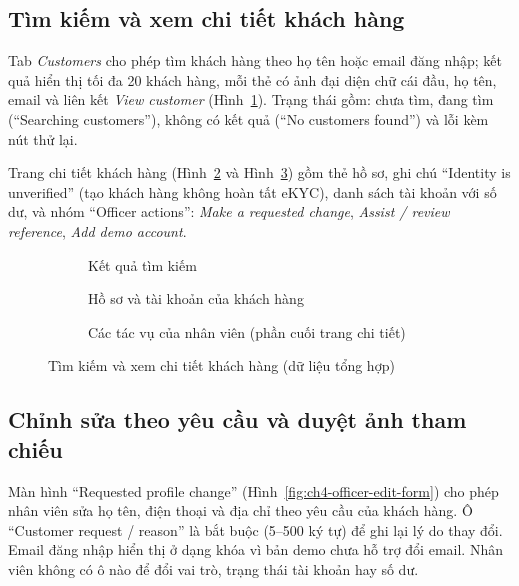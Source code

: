 \subsection{Tìm kiếm và xem chi tiết khách hàng}
\label{sec:ch4-officer-search}

Tab \textit{Customers} cho phép tìm khách hàng theo họ tên hoặc email đăng nhập; kết quả hiển thị tối đa 20 khách hàng, mỗi thẻ có ảnh đại diện chữ cái đầu, họ tên, email và liên kết \textit{View customer} (Hình~\ref{fig:ch4-officer-search-list}). Trạng thái gồm: chưa tìm, đang tìm (``Searching customers''), không có kết quả (``No customers found'') và lỗi kèm nút thử lại.

Trang chi tiết khách hàng (Hình~\ref{fig:ch4-officer-detail-top} và Hình~\ref{fig:ch4-officer-detail-actions}) gồm thẻ hồ sơ, ghi chú ``Identity is unverified'' (tạo khách hàng không hoàn tất eKYC), danh sách tài khoản với số dư, và nhóm ``Officer actions'': \textit{Make a requested change}, \textit{Assist / review reference}, \textit{Add demo account}.

\begin{figure}[H]
\centering
\begin{subfigure}[t]{0.31\textwidth}
  \centering
  \caption{Kết quả tìm kiếm}
  \label{fig:ch4-officer-search-list}
\end{subfigure}\hfill
\begin{subfigure}[t]{0.31\textwidth}
  \centering
  \caption{Hồ sơ và tài khoản của khách hàng}
  \label{fig:ch4-officer-detail-top}
\end{subfigure}\hfill
\begin{subfigure}[t]{0.31\textwidth}
  \centering
  \caption{Các tác vụ của nhân viên (phần cuối trang chi tiết)}
  \label{fig:ch4-officer-detail-actions}
\end{subfigure}
\caption{Tìm kiếm và xem chi tiết khách hàng (dữ liệu tổng hợp)}
\label{fig:ch4-officer-search}
\end{figure}

\subsection{Chỉnh sửa theo yêu cầu và duyệt ảnh tham chiếu}
\label{sec:ch4-officer-edit}

Màn hình ``Requested profile change'' (Hình~\ref{fig:ch4-officer-edit-form}) cho phép nhân viên sửa họ tên, điện thoại và địa chỉ theo yêu cầu của khách hàng. Ô ``Customer request / reason'' là bắt buộc (5--500 ký tự) để ghi lại lý do thay đổi. Email đăng nhập hiển thị ở dạng khóa vì bản demo chưa hỗ trợ đổi email. Nhân viên không có ô nào để đổi vai trò, trạng thái tài khoản hay số dư.

